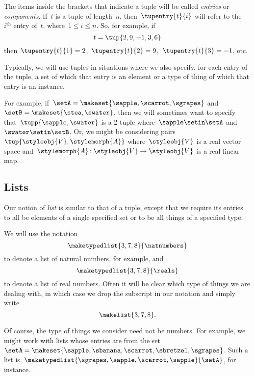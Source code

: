 The items inside the brackets that indicate a tuple will be called \emph{entries} or \emph{components}.
If~$t$ is a tuple of length~$n$, then~$\tupentry{t}{i}$ will refer to the~$i^{\text{th}}$ entry of~$t$, where~$1 \leq i \leq n$.
So, for example, if
\begin{equation}
    t = \tup{2,9,-1, 3, 6}
\end{equation}
then~$\tupentry{t}{1} = 2$,~$\tupentry{t}{2} = 9$,~$\tupentry{t}{3} = -1$, etc.

Typically, we will use tuples in situations where we also specify, for each entry of the tuple, a set of which that entry is an element or a type of thing of which that entry is an instance.

For example, if~$\setA = \makeset{ \sapple, \scarrot, \sgrapes}$ and~$\setB = \makeset{ \stea, \swater }$, then we will sometimes want to specify that~$\tupp{\sapple, \swater}$ is a 2-tuple where~$\sapple \setin\setA$ and~$\swater \setin\setB$.
Or, we might be considering pairs~$\tup{\styleobj{V}, \stylemorph{A}}$ where~$\styleobj{V}$ is a real vector space and~$\stylemorph{A}\colon \styleobj{V} \to \styleobj{V}$ is a real linear map.

\subsection{Lists}
\label{sec:lists}

Our notion of \emph{list} is similar to that of a tuple, except that we require its entries to all be elements of a single specified set or to be all things of a specified type.

We will use the notation
\begin{equation}
    \maketypedlist{3, 7, 8}{\natnumbers}
\end{equation}
to denote a list of natural numbers, for example, and
\begin{equation}
    \maketypedlist{3, 7, 8}{\reals}
\end{equation}
to denote a list of real numbers.
Often it will be clear which type of things we are dealing with, in which case we drop the subscript in our notation and simply write
\begin{equation}
    \makelist{3, 7, 8}.
\end{equation}

Of course, the type of things we consider need not be numbers.
For example, we might work with lists whose entries are from the set~$\setA = \makeset{\sapple, \sbanana, \scarrot, \sbretzel, \sgrapes}$.
Such a list is~$\maketypedlist{\sgrapes, \sapple, \scarrot, \sapple}{\setA}$, for instance.


